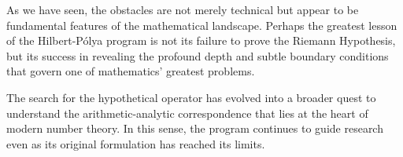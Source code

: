 As we have seen, the obstacles are not merely technical but appear to be fundamental features of the mathematical landscape. Perhaps the greatest lesson of the Hilbert-Pólya program is not its failure to prove the Riemann Hypothesis, but its success in revealing the profound depth and subtle boundary conditions that govern one of mathematics' greatest problems.

The search for the hypothetical operator has evolved into a broader quest to understand the arithmetic-analytic correspondence that lies at the heart of modern number theory. In this sense, the program continues to guide research even as its original formulation has reached its limits.